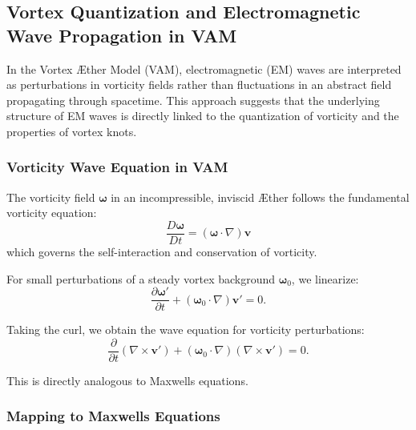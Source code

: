 \subsection{Vortex Quantization and Electromagnetic Wave Propagation in VAM}

In the Vortex Æther Model (VAM), electromagnetic (EM) waves are interpreted as perturbations in vorticity fields rather than fluctuations in an
abstract field propagating through spacetime. This approach suggests that the underlying structure of EM waves is directly linked to the quantization of vorticity and the properties of vortex knots.

\subsubsection*{Vorticity Wave Equation in VAM}

The vorticity field $\boldsymbol{\omega}$ in an incompressible, inviscid Æther follows the fundamental vorticity equation:
\begin{equation*}
    \frac{D\boldsymbol{\omega}}{Dt} = (\boldsymbol{\omega} \cdot \nabla) \mathbf{v}
\end{equation*}
which governs the self-interaction and conservation of vorticity.

For small perturbations of a steady vortex background $\boldsymbol{\omega}_0$, we linearize:
\begin{equation*}
    \frac{\partial \boldsymbol{\omega}'}{\partial t} + (\boldsymbol{\omega}_0 \cdot \nabla) \mathbf{v}' = 0.
\end{equation*}

Taking the curl, we obtain the wave equation for vorticity perturbations:
\begin{equation*}
    \frac{\partial}{\partial t} (\nabla \times \mathbf{v}') + (\boldsymbol{\omega}_0 \cdot \nabla) (\nabla \times \mathbf{v}') = 0.
\end{equation*}

This is directly analogous to Maxwell\rqs s equations.

\subsubsection*{Mapping to Maxwell\rqs s Equations}


